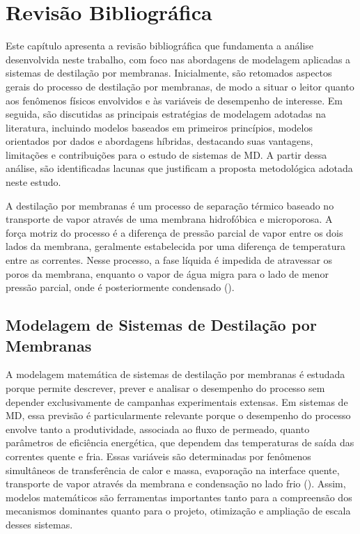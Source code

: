 \chapter{Revisão Bibliográfica}
\label{chap3}

Este capítulo apresenta a revisão bibliográfica que fundamenta a análise desenvolvida neste trabalho, com foco nas abordagens de modelagem aplicadas a sistemas de destilação por membranas. Inicialmente, são retomados aspectos gerais do processo de destilação por membranas, de modo a situar o leitor quanto aos fenômenos físicos envolvidos e às variáveis de desempenho de interesse. Em seguida, são discutidas as principais estratégias de modelagem adotadas na literatura, incluindo modelos baseados em primeiros princípios, modelos orientados por dados e abordagens híbridas, destacando suas vantagens, limitações e contribuições para o estudo de sistemas de MD. A partir dessa análise, são identificadas lacunas que justificam a proposta metodológica adotada neste estudo.

A destilação por membranas é um processo de separação térmico baseado no transporte de vapor através de uma membrana hidrofóbica e microporosa. A força motriz do processo é a diferença de pressão parcial de vapor entre os dois lados da membrana, geralmente estabelecida por uma diferença de temperatura entre as correntes. Nesse processo, a fase líquida é impedida de atravessar os poros da membrana, enquanto o vapor de água migra para o lado de menor pressão parcial, onde é posteriormente condensado (\cite{ExperimentalMD, S2MD}).

\section{Modelagem de Sistemas de Destilação por Membranas}
\label{sec:modelagem_md}

A modelagem matemática de sistemas de destilação por membranas é estudada porque permite descrever, prever e analisar o desempenho do processo sem depender exclusivamente de campanhas experimentais extensas. Em sistemas de MD, essa previsão é particularmente relevante porque o desempenho do processo envolve tanto a produtividade, associada ao fluxo de permeado, quanto parâmetros de eficiência energética, que dependem das temperaturas de saída das correntes quente e fria. Essas variáveis são determinadas por fenômenos simultâneos de transferência de calor e massa, evaporação na interface quente, transporte de vapor através da membrana e condensação no lado frio (\cite{ExperimentalMD, S2MD}). Assim, modelos matemáticos são ferramentas importantes tanto para a compreensão dos mecanismos dominantes quanto para o projeto, otimização e ampliação de escala desses sistemas.

